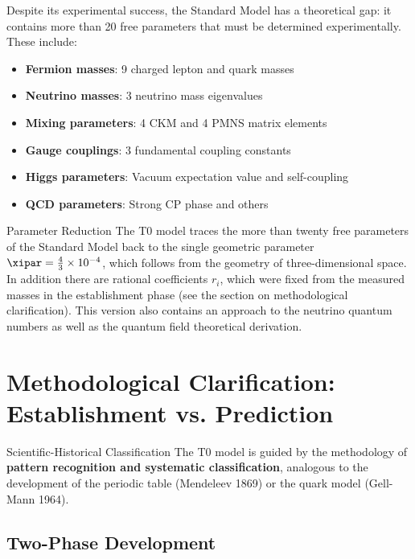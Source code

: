 	Despite its experimental success, the Standard Model has a theoretical gap: it contains more than 20 free parameters that must be determined experimentally. These include:
	
	\begin{itemize}
		\item \textbf{Fermion masses}: 9 charged lepton and quark masses
		\item \textbf{Neutrino masses}: 3 neutrino mass eigenvalues
		\item \textbf{Mixing parameters}: 4 CKM and 4 PMNS matrix elements
		\item \textbf{Gauge couplings}: 3 fundamental coupling constants
		\item \textbf{Higgs parameters}: Vacuum expectation value and self-coupling
		\item \textbf{QCD parameters}: Strong CP phase and others
	\end{itemize}
	
	\begin{important}{Parameter Reduction}{}
		The T0 model traces the more than twenty free parameters of the Standard Model back to the single geometric parameter $\xipar = \frac{4}{3} \times 10^{-4}$, which follows from the geometry of three-dimensional space. In addition there are rational coefficients $r_i$, which were fixed from the measured masses in the establishment phase (see the section on methodological clarification). This version also contains an approach to the neutrino quantum numbers as well as the quantum field theoretical derivation.
	\end{important}
	
	\section{Methodological Clarification: Establishment vs. Prediction}
	\label{sec:methodological_clarification}
	
	\begin{important}{Scientific-Historical Classification}{}
		The T0 model is guided by the methodology of \textbf{pattern recognition and systematic classification}, analogous to the development of the periodic table (Mendeleev 1869) or the quark model (Gell-Mann 1964).
	\end{important}
	
	\subsection{Two-Phase Development}
	\label{subsec:two_phases}
	
